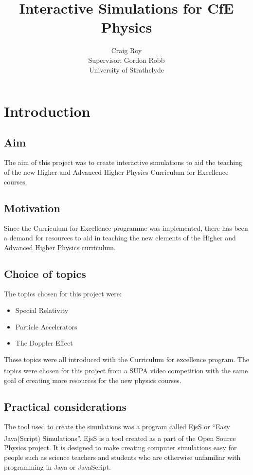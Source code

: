 \documentclass[11pt]{article}
\title{Interactive Simulations for CfE Physics}
\author{Craig Roy\vspace{0.5cm}\\Supervisor: Gordon Robb\vspace{0.5cm}\\University of Strathclyde}
\date{}
\begin{document}
\maketitle


\section*{Introduction}
\subsection*{Aim}
The aim of this project was to create interactive simulations to aid the teaching of the new Higher and Advanced Higher Physics Curriculum for Excellence courses.

\subsection*{Motivation}
Since the Curriculum for Excellence programme was implemented, there has been a demand for resources to aid in teaching the new elements of the Higher and Advanced Higher Physics curriculum.

\subsection*{Choice of topics}
The topics chosen for this project were:
\begin{itemize}
\item Special Relativity
\item Particle Accelerators
\item The Doppler Effect
\end{itemize}
These topics were all introduced with the Curriculum for excellence
program. The topics were chosen for this project from a
SUPA\textsuperscript{\cite{supa}} video competition with the same goal of creating more
resources for the new physics courses.

\subsection*{Practical considerations}
The tool used to create the simulations was a program called EjsS or
``Easy Java(Script) Simulations''. EjsS\textsuperscript{\cite{ejs}} is a tool created as a part of the Open Source Physics project. It is designed to make creating computer simulations easy for people such as science teachers and students who are otherwise unfamiliar with programming in Java or JavaScript.
\end{document}

